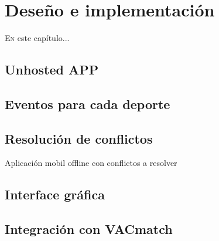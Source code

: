 \chapter{Deseño e implementación}
\minitoc
\label{chap:Desenoeimplementacion}
\vspace{0.5cm}


  \lettrine{E}{n} este capítulo...

  \section{Unhosted APP}
  \section{Eventos para cada deporte}
  \section{Resolución de conflictos}
  Aplicación mobil offline con conflictos a resolver
  \section{Interface gráfica}
  \section{Integración con VACmatch}